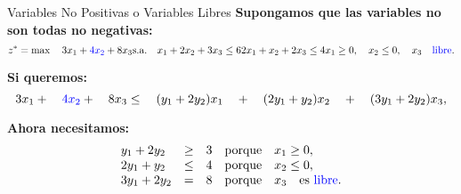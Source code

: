 \documentclass{beamer}
\begin{document}
\begin{frame}{Variables No Positivas o Variables Libres}
    \textbf{Supongamos que las variables no son todas no negativas:}
    \[
    z^* = \max \quad 3x_1 + \textcolor{blue}{4x_2} + 8x_3 \\
    \text{s.a.} \quad x_1 + 2x_2 + 3x_3 \leq 6 \\
    2x_1 + x_2 + 2x_3 \leq 4 \\
    x_1 \geq 0, \quad x_2 \leq 0, \quad x_3 \quad \text{\textcolor{blue}{libre}}.
    \]

    \vspace{0.3cm}
    \textbf{Si queremos:}
    \[
    3x_1 + \quad \textcolor{blue}{4x_2} + \quad 8x_3 \\
    \leq \quad (y_1 + 2y_2)x_1 \quad + \quad (2y_1 + y_2)x_2 \quad + \quad (3y_1 + 2y_2)x_3,
    \]

    \vspace{0.3cm}
    \textbf{Ahora necesitamos:}
    \[
    \begin{array}{lcl}
    y_1 + 2y_2 & \geq & 3 \quad \text{porque} \quad x_1 \geq 0, \\
    2y_1 + y_2 & \leq & 4 \quad \text{porque} \quad x_2 \leq 0, \\
    3y_1 + 2y_2 & = & 8 \quad \text{porque} \quad x_3 \quad \text{es \textcolor{blue}{libre}}.
    \end{array}
    \]
\end{frame}
\end{document}
